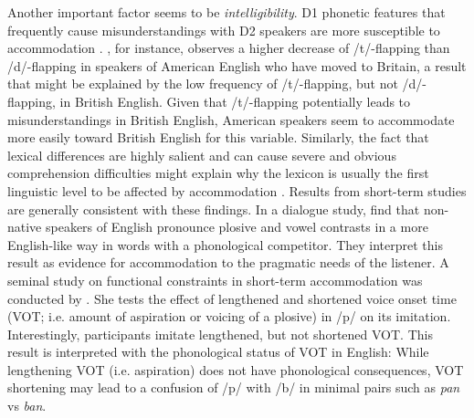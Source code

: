 \documentclass[output=paper,
modfonts
]{langscibook}
\begin{document}
Another important factor seems to be \textit{intelligibility}. D1 phonetic features that frequently cause misunderstandings with D2 speakers are more susceptible to accommodation \citep{trudgill_dialects_1986}. \citet{shockey_all_1984}, for instance, observes a higher decrease of /t/-flapping than /d/-flapping in speakers of American English who have moved to Britain, a result that might be explained by the low frequency of /t/-flapping, but not /d/-flapping, in British English. Given that /t/-flapping potentially leads to misunderstandings in British English, American speakers seem to accommodate more easily toward British English for this variable. Similarly, the fact that lexical differences are highly salient and can cause severe and obvious comprehension difficulties \citep{trudgill_dialects_1986} might explain why the lexicon is usually the first linguistic level to be affected by accommodation \citep{Bonomi2010,chambers_dialect_1992}.
Results from short-term studies are generally consistent with these findings. In a dialogue study, \cite{hwang_phonetic_2015} find that non-native speakers of English pronounce plosive and vowel contrasts in a more English-like way in words with a phonological competitor. They interpret this result as evidence for accommodation to the pragmatic needs of the listener.
A seminal study on functional constraints in short-term accommodation was conducted by \citet{nielsen_specificity_2011}. She tests the effect of lengthened and shortened voice onset time (VOT; i.e. amount of aspiration or voicing of a plosive) in /p/ on its imitation. Interestingly, participants imitate lengthened, but not shortened VOT. This result is interpreted with the phonological status of VOT in English: While lengthening VOT (i.e. aspiration) does not have phonological consequences, VOT shortening may lead to a confusion of /p/ with /b/ in minimal pairs such as \textit{pan} vs \textit{ban}.
% 
% 
% 
%
\end{document}

